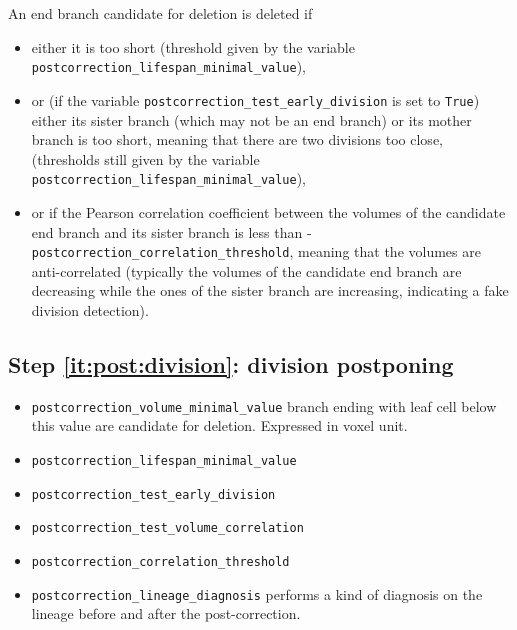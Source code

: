 An end branch candidate for deletion is deleted if
\begin{itemize}
\itemsep -0.5ex
\item either it is too short (threshold given by the variable \texttt{postcorrection\_lifespan\_minimal\_value}),
\item or (if the variable \texttt{postcorrection\_test\_early\_division} is set to \texttt{True}) either its sister branch (which may not be an end branch) or its mother branch is too short, meaning that there are two divisions too close, (thresholds still given by the variable \texttt{postcorrection\_lifespan\_minimal\_value}),
\item or if the Pearson correlation coefficient between the volumes of the candidate end branch and its sister branch is less than 
-\texttt{postcorrection\_correlation\_threshold}, meaning that the volumes are anti-correlated (typically the volumes of the candidate end branch are decreasing while the ones of the sister branch are increasing, indicating a fake division detection).
\end{itemize}

\subsection{Step \ref{it:post:division}: division postponing}

      
\begin{itemize}
\itemsep -0.5ex
\item \texttt{postcorrection\_volume\_minimal\_value}
  branch ending with leaf cell below this value are candidate for deletion. Expressed in voxel unit.
\item \texttt{postcorrection\_lifespan\_minimal\_value}
\item \texttt{postcorrection\_test\_early\_division}
\item \texttt{postcorrection\_test\_volume\_correlation}
\item \texttt{postcorrection\_correlation\_threshold}
\item \texttt{postcorrection\_lineage\_diagnosis}
  performs a kind of diagnosis on the lineage before and after the post-correction.
\end{itemize}






